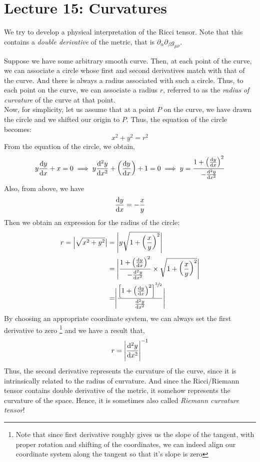 \section*{Lecture 15: Curvatures}
We try to develop a physical interpretation of the Ricci tensor. Note that this contains a \textit{double derivative} of the metric, that is $\partial_\alpha\partial_\beta g_{\mu\nu}$. 
\begin{figure}[H]
    \centering 
    
\end{figure}
\noindent
Suppose we have some arbitrary smooth curve. Then, at each point of the curve, we can associate a circle whose first and second derivatives match with that of the curve. And there is always a radius associated with such a circle. Thus, to each point on the curve, we can associate a radius $r$, referred to as the \textit{radius of curvature} of the curve at that point. \\[0.2cm]
Now, for simplicity, let us assume that at a point $P$ on the curve, we have drawn the circle and we shifted our origin to $P$. Thus, the equation of the circle becomes: 
$$x^2+y^2=r^2$$
From the equation of the circle, we obtain,
$$y\dv{y}{x} + x = 0 \implies y \dv[2]{y}{x} + \qty(\dv{y}{x})+1 = 0 \implies y = \frac{1+\qty(\dv{y}{x})^2}{-\dv[2]{y}{x}}$$
Also, from above, we have $$\dv{y}{x} = -\frac{x}{y}$$
Then we obtain an expression for the radius of the circle:
\begin{align*}
    r = \Big|\sqrt{x^2+y^2}\big| &=\Bigg|y\sqrt{1+\qty(\frac{x}{y})^2}\Bigg|\\
    &=\Bigg| \frac{1+\qty(\dv{y}{x})^2}{-\dv[2]{y}{x}} \times \sqrt{1+\qty(\frac{x}{y})^2}\Bigg|\\
    &=\Biggr|\frac{\qty[1+\qty(\dv{y}{x})^2]^{\sfrac{3}{2}}}{\dv[2]{y}{x}} \Biggr|
\end{align*}
By choosing an appropriate coordinate system, we can always set the first derivative to zero \footnote{Note that since first derivative roughly gives us the slope of the tangent, with proper rotation and shifting of the coordinates, we can indeed align our coordinate system along the tangent so that it's slope is zero} and we have a result that,
$$r = \Bigg|\dv[2]{y}{x}\Bigg|^{-1}$$
Thus, the second derivative represents the curvature of the curve, since it is intrinsically related to the radius of curvature. And since the Ricci/Riemann tensor contains double derivative of the metric, it somehow represents the curvature of the space. Hence, it is sometimes also called \textit{Riemann curvature tensor}!\\[0.2cm]
